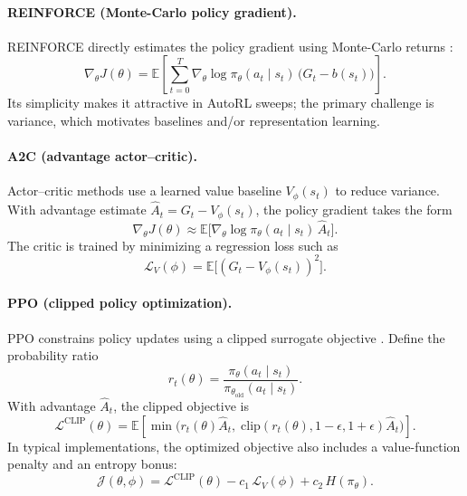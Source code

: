 \documentclass[11pt]{article}
\begin{document}
\paragraph{REINFORCE (Monte-Carlo policy gradient).}
REINFORCE directly estimates the policy gradient using Monte-Carlo returns \parencite{Williams1992REINFORCE}:
\begin{equation}
\nabla_\theta J(\theta) = \mathbb{E}\left[\sum_{t=0}^{T} \nabla_\theta \log \pi_\theta(a_t\mid s_t)\,\big(G_t-b(s_t)\big)\right].
\end{equation}
Its simplicity makes it attractive in AutoRL sweeps; the primary challenge is variance, which motivates baselines and/or representation learning.

\paragraph{A2C (advantage actor--critic).}
Actor--critic methods use a learned value baseline $V_\phi(s_t)$ to reduce variance. With advantage estimate $\hat{A}_t=G_t-V_\phi(s_t)$, the policy gradient takes the form
\begin{equation}
\nabla_\theta J(\theta) \approx \mathbb{E}\big[\nabla_\theta\log\pi_\theta(a_t\mid s_t)\,\hat{A}_t\big].
\end{equation}
The critic is trained by minimizing a regression loss such as
\begin{equation}
\mathcal{L}_V(\phi)=\mathbb{E}\big[(G_t - V_\phi(s_t))^2\big].
\end{equation}

\paragraph{PPO (clipped policy optimization).}
PPO constrains policy updates using a clipped surrogate objective \parencite{Schulman2017PPO}. Define the probability ratio
\begin{equation}
 r_t(\theta)=\frac{\pi_\theta(a_t\mid s_t)}{\pi_{\theta_{\mathrm{old}}}(a_t\mid s_t)}.
\end{equation}
With advantage $\hat{A}_t$, the clipped objective is
\begin{equation}
\mathcal{L}^{\mathrm{CLIP}}(\theta)=\mathbb{E}\left[\min\Big(r_t(\theta)\hat{A}_t,\;\mathrm{clip}(r_t(\theta),1-\epsilon,1+\epsilon)\hat{A}_t\Big)\right].
\end{equation}
In typical implementations, the optimized objective also includes a value-function penalty and an entropy bonus:
\begin{equation}
\mathcal{J}(\theta,\phi)=\mathcal{L}^{\mathrm{CLIP}}(\theta) - c_1\,\mathcal{L}_V(\phi) + c_2\,H(\pi_\theta).
\end{equation}
\end{document}
